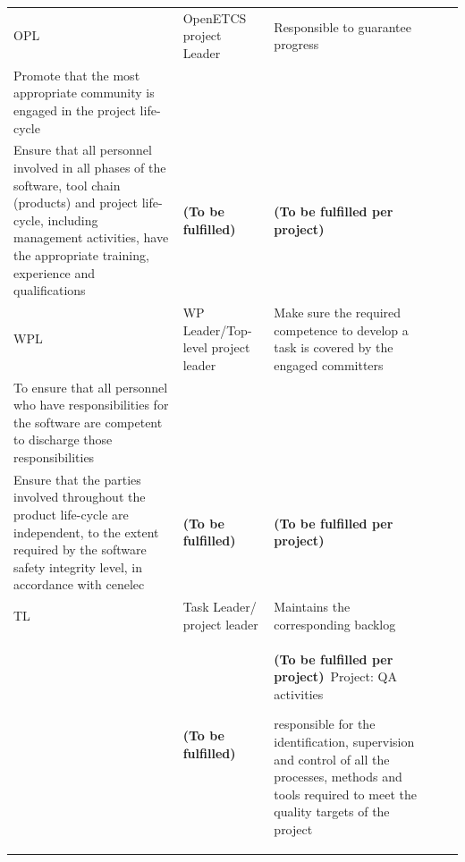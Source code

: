 \documentclass{template/openetcs_article}
\begin{document}
\begin{landscape}
\begin{flushleft}
\begin{supertabular}[H]{|m{1cm}|m{3cm}|m{12cm}|m{4,5cm}|m{4,5cm}|}
\hline
OPL &
OpenETCS project Leader &
\raggedright
Responsible to guarantee progress\\
Promote that the most appropriate community is engaged in the project life-cycle\\
Ensure that all personnel involved in all phases of the software, tool chain (products)  and project life-cycle, including management activities, have the appropriate training, experience and qualifications
&
\textbf{(To be fulfilled)} &
\textbf{(To be fulfilled per project)} \\\hline
WPL &
WP Leader/Top-level project leader &
\raggedright
Make sure the required competence to develop a task is covered by the engaged committers\\
To ensure that all personnel who have responsibilities for the software are competent to discharge those responsibilities\\
Ensure that the parties involved throughout the product life-cycle are independent, to the extent required by the software safety integrity level, in accordance with cenelec
&
\textbf{(To be fulfilled)} &
\textbf{(To be fulfilled per project)} \\\hline
TL &
Task Leader/ project leader &
\raggedright
Maintains the corresponding backlog\\
&
\textbf{(To be fulfilled)} &
\textbf{(To be fulfilled per project)}\
Project: QA activities
\begin{description}
\item responsible for the identification, supervision and control of all the processes, methods and tools required to meet the quality targets of the project

\end{description}
\end{supertabular}
\end{flushleft}
\end{landscape}
\end{document}
